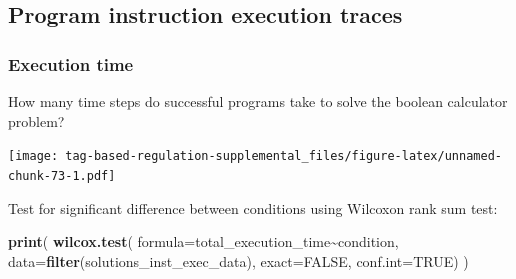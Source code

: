 \documentclass[
]{book}
\newenvironment{Shaded}{\begin{snugshade}}{\end{snugshade}}
\newcommand{\CharTok}[1]{\textcolor[rgb]{0.31,0.60,0.02}{#1}}
\newcommand{\CommentTok}[1]{\textcolor[rgb]{0.56,0.35,0.01}{\textit{#1}}}
\newcommand{\DataTypeTok}[1]{\textcolor[rgb]{0.13,0.29,0.53}{#1}}
\newcommand{\FloatTok}[1]{\textcolor[rgb]{0.00,0.00,0.81}{#1}}
\newcommand{\KeywordTok}[1]{\textcolor[rgb]{0.13,0.29,0.53}{\textbf{#1}}}
\newcommand{\NormalTok}[1]{#1}
\newcommand{\OperatorTok}[1]{\textcolor[rgb]{0.81,0.36,0.00}{\textbf{#1}}}
\newcommand{\OtherTok}[1]{\textcolor[rgb]{0.56,0.35,0.01}{#1}}
\newcommand{\StringTok}[1]{\textcolor[rgb]{0.31,0.60,0.02}{#1}}
\begin{document}
\hypertarget{program-instruction-execution-traces-2}{%
\subsection{Program instruction execution traces}\label{program-instruction-execution-traces-2}}

\hypertarget{execution-time-2}{%
\subsubsection{Execution time}\label{execution-time-2}}

How many time steps do successful programs take to solve the boolean calculator problem?

\begin{Shaded}
\end{Shaded}

\texttt{[image: tag-based-regulation-supplemental\_files/figure-latex/unnamed-chunk-73-1.pdf]}

Test for significant difference between conditions using Wilcoxon rank sum test:

\begin{Shaded}
\begin{Highlighting}[]
\KeywordTok{print}\NormalTok{(}
  \KeywordTok{wilcox.test}\NormalTok{(}
    \DataTypeTok{formula=}\NormalTok{total\_execution\_time}\OperatorTok{\textasciitilde{}}\NormalTok{condition,}
    \DataTypeTok{data=}\KeywordTok{filter}\NormalTok{(solutions\_inst\_exec\_data),}
    \DataTypeTok{exact=}\OtherTok{FALSE}\NormalTok{,}
    \DataTypeTok{conf.int=}\OtherTok{TRUE}\NormalTok{)}
\NormalTok{)}
\end{Highlighting}
\end{Shaded}
\end{document}
